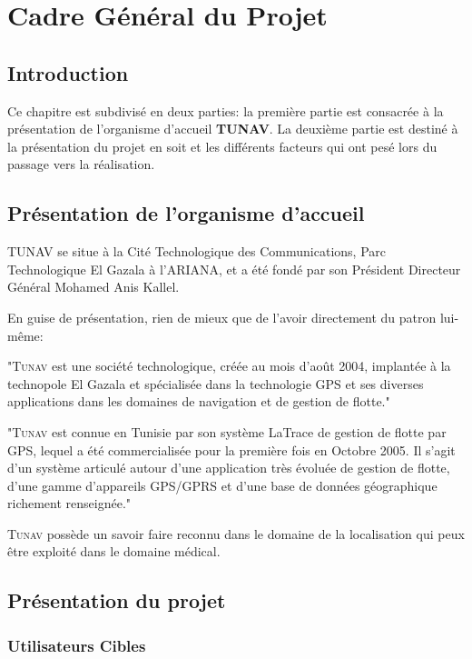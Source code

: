 
\chapter{Cadre Général du Projet}
\section{Introduction}

Ce chapitre est subdivisé en deux parties: la première partie est
consacrée à la présentation de l’organisme d’accueil \textbf{TUNAV}. La
deuxième partie est destiné à la présentation du projet en soit et les
différents facteurs qui ont pesé lors du passage vers la réalisation.

\section{Présentation de l'organisme d'accueil}  

TUNAV se situe à la Cité Technologique des Communications, Parc
Technologique El Gazala à l’ARIANA, et a été fondé par son Président
Directeur Général Mohamed Anis Kallel.

En guise de présentation, rien de mieux que de l’avoir directement du patron lui-même\cite{index_tunisie}:

"\textsc{Tunav} est une société technologique, créée au mois d’août
2004, implantée à la technopole El Gazala et spécialisée dans la
technologie GPS et ses diverses applications dans les domaines de
navigation et de gestion de flotte."

"\textsc{Tunav} est connue en Tunisie par son système \og{}LaTrace\fg{}
de gestion de flotte par GPS, lequel a été commercialisée pour la
première fois en Octobre 2005. Il s'agit d'un système articulé autour
d'une application très évoluée de gestion de flotte, d'une gamme
d'appareils GPS/GPRS et d'une base de données géographique richement
renseignée."

\textsc{Tunav} possède un savoir faire reconnu dans le domaine de la
localisation qui peux être exploité dans le domaine médical.

\section{Présentation du projet}

\subsection{Utilisateurs Cibles}

